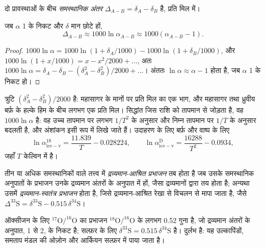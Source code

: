\begin{definition}[समस्थानिक अंतर]\label{def:b3:stable-isotopes:big-delta}
दो प्रावस्थाओं के बीच \emph{समस्थानिक अंतर}
$\Delta_{A-B} = \delta_A - \delta_B$ है, प्रति मिल में।
\end{definition}

\begin{proposition}[समस्थानिक अंतर और प्रभाजन गुणांक]
\label{prop:b3:stable-isotopes:big-delta}
जब $\alpha$ 1 के निकट और $\delta$ मान छोटे हों,
\[
\Delta_{A-B} \approx 1000\ln\alpha_{A-B} \approx 1000(\alpha_{A-B} - 1).
\]
\end{proposition}

\begin{proof}
$1000\ln\alpha = 1000\ln(1 + \delta_A/1000) - 1000\ln(1 + \delta_B/1000)$, और
$1000\ln(1 + x/1000) = x - x^2/2000 + \dots$, अतः $1000\ln\alpha = \delta_A -
\delta_B - (\delta_A^2 - \delta_B^2)/2000 + \dots$। अंततः $\ln\alpha \approx
\alpha - 1$ होता है, जब $\alpha$ 1 के निकट हो।
\end{proof}

त्रुटि $(\delta_A^2 - \delta_B^2)/2000$ है: महासागर के मानों पर प्रति मिल का एक भाग,
और महासागर तथा ध्रुवीय बर्फ़ के हल्के हिम के बीच लगभग एक
प्रति मिल।
सिद्धांत जिस राशि को तापमान से जोड़ता है, वह $1000\ln\alpha$ है: वह
उच्च तापमान पर लगभग $1/T^2$ के अनुसार और निम्न तापमान पर $1/T$ के अनुसार बदलती है,
और अंशांकन इसी रूप में लिखे जाते हैं। उदाहरण के लिए बर्फ़ और वाष्प के लिए
\[
\ln\alpha^{18}_{\mathrm{ice-v}} = \frac{11.839}{T} - 0.028224, \qquad
\ln\alpha^{\mathrm D}_{\mathrm{ice-v}} = \frac{16288}{T^2} - 0.0934,
\]
जहाँ $T$ केल्विन में है।

\begin{definition}[द्रव्यमान-आश्रित और द्रव्यमान-स्वतंत्र प्रभाजन]\label{def:b3:stable-isotopes:mif}
तीन या अधिक समस्थानिकों वाले तत्त्व में \emph{द्रव्यमान-आश्रित
प्रभाजन} तब होता है जब उसके समस्थानिक अनुपातों के प्रभाजन
उनके द्रव्यमान अंतरों के अनुपात में हों, जैसा द्रव्यमानों द्वारा तय होता है;
अन्यथा उसमें \emph{द्रव्यमान-स्वतंत्र
प्रभाजन} होता है, जिसे द्रव्यमान-आश्रित रेखा से
विचलन से मापा जाता है, जैसे $\Delta^{33}\mathrm S = \delta^{33}\mathrm S
- 0.515\,\delta^{34}\mathrm S$।
\end{definition}

ऑक्सीजन के लिए $^{17}\mathrm O/^{16}\mathrm O$ का प्रभाजन $^{18}\mathrm O/^{16}\mathrm O$ के
लगभग 0.52 गुना है, जो द्रव्यमान अंतरों के अनुपात, 1 से 2, के निकट है;
सल्फ़र के लिए $\delta^{33}\mathrm S = 0.515\,\delta^{34}\mathrm S$ है।
 दुर्लभ है: यह उल्कापिंडों, समताप मंडल की ओज़ोन और
आर्कियन सल्फ़र में पाया जाता है।

